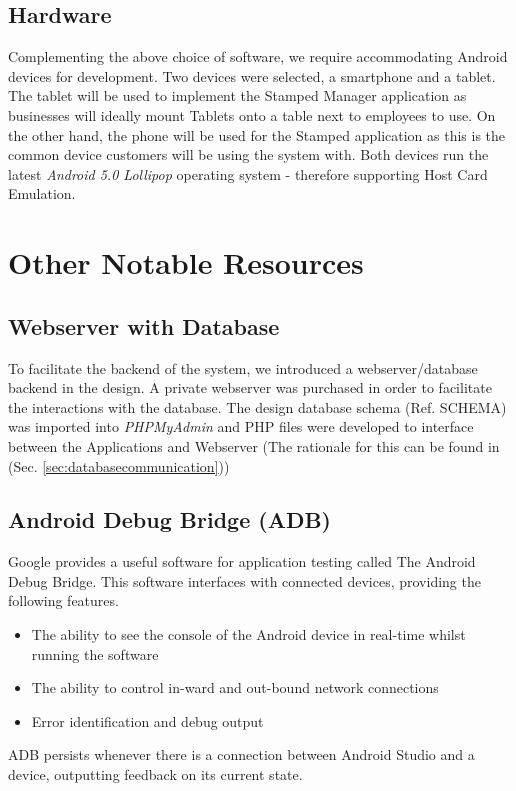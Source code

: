 \subsection{Hardware}
Complementing the above choice of software, we require accommodating Android devices for development. Two devices were selected, a smartphone and a tablet. The tablet will be used to implement the Stamped Manager application as businesses will ideally mount Tablets onto a table next to employees to use. On the other hand, the phone will be used for the Stamped application as this is the common device customers will be using the system with. Both devices run the latest \emph{Android 5.0 Lollipop} operating system - therefore supporting Host Card Emulation. 

\section{Other Notable Resources}
\subsection{Webserver with Database}
To facilitate the backend of the system, we introduced a webserver/database backend in the design. A private webserver was purchased in order to facilitate the interactions with the database. The design database schema (Ref. SCHEMA) was imported into \emph{PHPMyAdmin} and PHP files were developed to interface between the Applications and Webserver (The rationale for this can be found in (Sec. \ref{sec:databasecommunication}))

\subsection{Android Debug Bridge (ADB)}
Google provides a useful software for application testing called The Android Debug Bridge. This software interfaces with connected devices, providing the following features.
\begin{itemize}
 \item The ability to see the console of the Android device in real-time whilst running the software
  \item The ability to control in-ward and out-bound network connections
   \item Error identification and debug output
\end{itemize} 

ADB persists whenever there is a connection between Android Studio and a device, outputting feedback on its current state.

